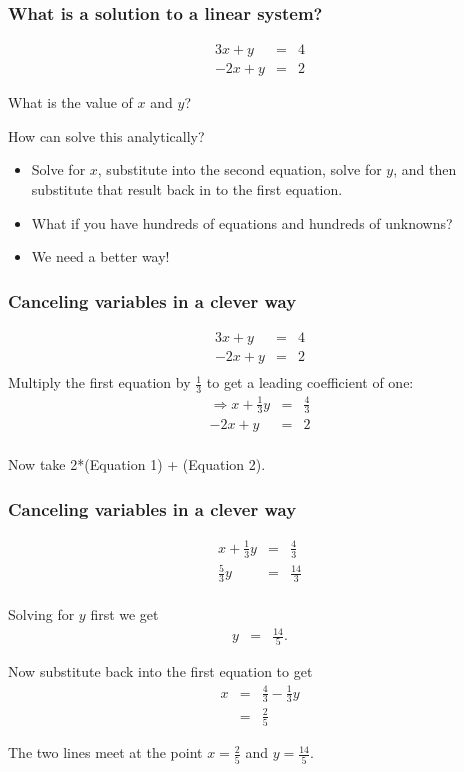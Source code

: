 \begin{frame}
  \frametitle{What is a solution to a linear system?}

  \begin{eqnarray*}
    3x + y & = & 4 \\
    -2x + y & = & 2
  \end{eqnarray*}

  What is the value of $x$ and $y$?

  How can solve this analytically?
  \begin{itemize}
  \item Solve for $x$, substitute into the second equation, solve
    for $y$, and then substitute that result back in to the first
    equation.
  \item What if you have hundreds of equations and hundreds of
    unknowns?
  \item We need a better way!
  \end{itemize}

\end{frame}


\begin{frame}
  \frametitle{Canceling variables in a clever way}

  \begin{eqnarray*}
    3x + y & = & 4 \\
    -2x + y & = & 2 \\
  \end{eqnarray*}
  Multiply the first equation by $\frac{1}{3}$ to get a leading
  coefficient of one:
  \begin{eqnarray*}
    \Rightarrow
    x + \frac{1}{3}y & = & \frac{4}{3} \\
    -2x + y & = & 2 \\
  \end{eqnarray*}

  Now take 2*(Equation 1) + (Equation 2).

\end{frame}


\begin{frame}
  \frametitle{Canceling variables in a clever way}

  \begin{eqnarray*}
    x + \frac{1}{3}y & = & \frac{4}{3} \\
    \frac{5}{3}  y & = & \frac{14}{3} \\
  \end{eqnarray*}

  Solving for $y$ first we get
  \begin{eqnarray*}
    y & = & \frac{14}{5}.
  \end{eqnarray*}

  Now substitute back into the first equation to get
  \begin{eqnarray*}
    x & = & \frac{4}{3} - \frac{1}{3} y \\
    & = & \frac{2}{5}
  \end{eqnarray*}

  The two lines meet at the point $x=\frac{2}{5}$ and $y=\frac{14}{5}$.

\end{frame}

